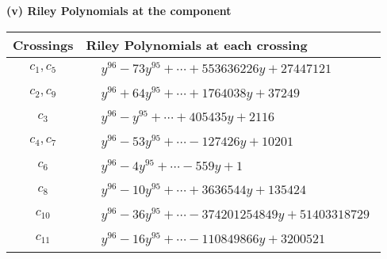 \documentclass[1p]{elsarticle_modified}
\theoremstyle{definition}
\begin{document}
\newpage\renewcommand{\arraystretch}{1}
\flushleft \textbf{(v) Riley Polynomials at the component}\newline \\
\begin{tabular}{m{50pt}|m{274pt}}
Crossings & \hspace{64pt}Riley Polynomials at each crossing \\
\hline $$\begin{aligned}c_{1},c_{5}\end{aligned}$$&$\begin{aligned}
&y^{96}-73 y^{95}+\cdots+553636226 y+27447121
\end{aligned}$\\
\hline $$\begin{aligned}c_{2},c_{9}\end{aligned}$$&$\begin{aligned}
&y^{96}+64 y^{95}+\cdots+1764038 y+37249
\end{aligned}$\\
\hline $$\begin{aligned}c_{3}\end{aligned}$$&$\begin{aligned}
&y^{96}- y^{95}+\cdots+405435 y+2116
\end{aligned}$\\
\hline $$\begin{aligned}c_{4},c_{7}\end{aligned}$$&$\begin{aligned}
&y^{96}-53 y^{95}+\cdots-127426 y+10201
\end{aligned}$\\
\hline $$\begin{aligned}c_{6}\end{aligned}$$&$\begin{aligned}
&y^{96}-4 y^{95}+\cdots-559 y+1
\end{aligned}$\\
\hline $$\begin{aligned}c_{8}\end{aligned}$$&$\begin{aligned}
&y^{96}-10 y^{95}+\cdots+3636544 y+135424
\end{aligned}$\\
\hline $$\begin{aligned}c_{10}\end{aligned}$$&$\begin{aligned}
&y^{96}-36 y^{95}+\cdots-374201254849 y+51403318729
\end{aligned}$\\
\hline $$\begin{aligned}c_{11}\end{aligned}$$&$\begin{aligned}
&y^{96}-16 y^{95}+\cdots-110849866 y+3200521
\end{aligned}$\\
\hline
\end{tabular}\\~\\
\end{document}
